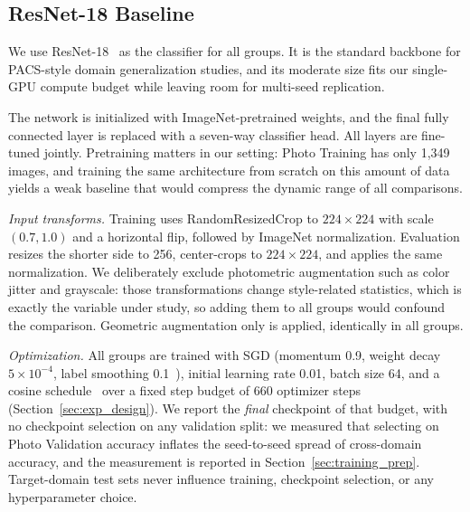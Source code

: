 \subsection{ResNet-18 Baseline}
\label{sec:resnet_baseline}

We use ResNet-18~\cite{he2016resnet} as the classifier for all groups. It is the standard backbone for PACS-style domain generalization studies, and its moderate size fits our single-GPU compute budget while leaving room for multi-seed replication.

The network is initialized with ImageNet-pretrained weights, and the final fully connected layer is replaced with a seven-way classifier head. All layers are fine-tuned jointly. Pretraining matters in our setting: Photo Training has only 1{,}349 images, and training the same architecture from scratch on this amount of data yields a weak baseline that would compress the dynamic range of all comparisons.

\textit{Input transforms.} Training uses RandomResizedCrop to $224\times224$ with scale $(0.7, 1.0)$ and a horizontal flip, followed by ImageNet normalization. Evaluation resizes the shorter side to 256, center-crops to $224\times224$, and applies the same normalization. We deliberately exclude photometric augmentation such as color jitter and grayscale: those transformations change style-related statistics, which is exactly the variable under study, so adding them to all groups would confound the comparison. Geometric augmentation only is applied, identically in all groups.

\textit{Optimization.} All groups are trained with SGD (momentum 0.9, weight decay $5\times10^{-4}$, label smoothing 0.1~\cite{szegedy2016rethinking}), initial learning rate 0.01, batch size 64, and a cosine schedule~\cite{loshchilov2017sgdr} over a fixed step budget of 660 optimizer steps (Section~\ref{sec:exp_design}). We report the \textit{final} checkpoint of that budget, with no checkpoint selection on any validation split: we measured that selecting on Photo Validation accuracy inflates the seed-to-seed spread of cross-domain accuracy, and the measurement is reported in Section~\ref{sec:training_prep}. Target-domain test sets never influence training, checkpoint selection, or any hyperparameter choice.

